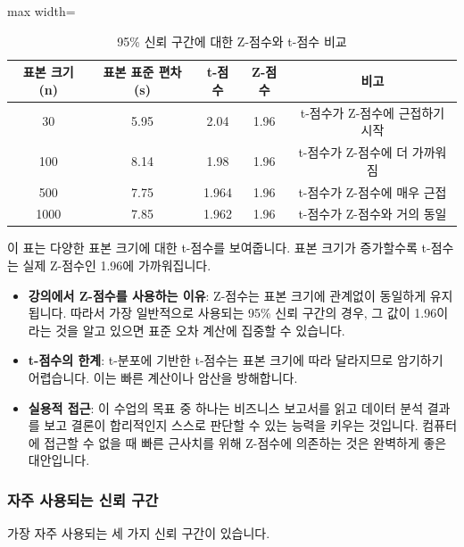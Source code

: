 \documentclass[11pt,a4paper]{article}
\begin{document}
\begin{table}[h!]
\centering
\caption{95\% 신뢰 구간에 대한 Z-점수와 t-점수 비교}
\label{tab:z_t_score_comparison}
\begin{adjustbox}{max width=\textwidth}
\begin{tabular}{ccccc}
\toprule
\textbf{표본 크기 (n)} & \textbf{표본 표준 편차 (s)} & \textbf{t-점수} & \textbf{Z-점수} & \textbf{비고} \\
\midrule
30 & 5.95 & 2.04 & 1.96 & t-점수가 Z-점수에 근접하기 시작 \\
100 & 8.14 & 1.98 & 1.96 & t-점수가 Z-점수에 더 가까워짐 \\
500 & 7.75 & 1.964 & 1.96 & t-점수가 Z-점수에 매우 근접 \\
1000 & 7.85 & 1.962 & 1.96 & t-점수가 Z-점수와 거의 동일 \\
\bottomrule
\end{tabular}
\end{adjustbox}
\end{table}

이 표는 다양한 표본 크기에 대한 t-점수를 보여줍니다. 표본 크기가 증가할수록 t-점수는 실제 Z-점수인 1.96에 가까워집니다.

\begin{itemize}
    \item \textbf{강의에서 Z-점수를 사용하는 이유}: Z-점수는 표본 크기에 관계없이 동일하게 유지됩니다. 따라서 가장 일반적으로 사용되는 95\% 신뢰 구간의 경우, 그 값이 1.96이라는 것을 알고 있으면 표준 오차 계산에 집중할 수 있습니다.
    \item \textbf{t-점수의 한계}: t-분포에 기반한 t-점수는 표본 크기에 따라 달라지므로 암기하기 어렵습니다. 이는 빠른 계산이나 암산을 방해합니다.
    \item \textbf{실용적 접근}: 이 수업의 목표 중 하나는 비즈니스 보고서를 읽고 데이터 분석 결과를 보고 결론이 합리적인지 스스로 판단할 수 있는 능력을 키우는 것입니다. 컴퓨터에 접근할 수 없을 때 빠른 근사치를 위해 Z-점수에 의존하는 것은 완벽하게 좋은 대안입니다.
\end{itemize}

\subsubsection*{자주 사용되는 신뢰 구간}
가장 자주 사용되는 세 가지 신뢰 구간이 있습니다.
\end{document}
